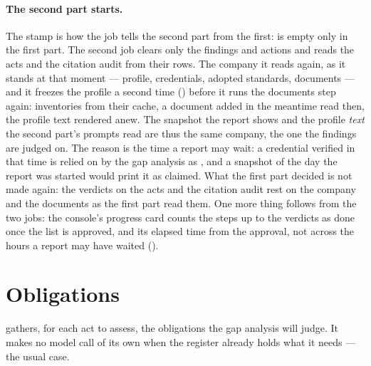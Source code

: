 \paragraph{The second part starts.} The stamp is how the job tells the second part from the
first:  is empty only in the first part. The second job clears only the
findings and actions and reads the acts and the citation audit from their rows. The company it
reads again, as it stands at that moment --- profile, credentials, adopted standards, documents
--- and it freezes the profile a second time () before it runs the
documents step again: inventories from their cache, a document added in the meantime read
then, the
profile text rendered anew. The snapshot the report shows and the profile \emph{text} the
second part's prompts read are thus the same company, the one the findings are judged on. The
reason is the time a report may wait: a credential verified in that time is relied on by the
gap analysis as , and a snapshot of the day the report was started would print
it as claimed. What the first part decided is not made again: the verdicts on the acts and the
citation audit rest on the company and the documents as the first part read them. One more
thing follows from the two jobs: the console's progress card counts the steps up to the
verdicts as done once the list is approved, and its elapsed time from the approval, not across
the hours a report may have waited ().


\section{Obligations}\label{sec:report:obligations}

 gathers, for each act to assess, the obligations the gap analysis will
judge. It makes no model call of its own when the register already holds what it needs --- the
usual case.

